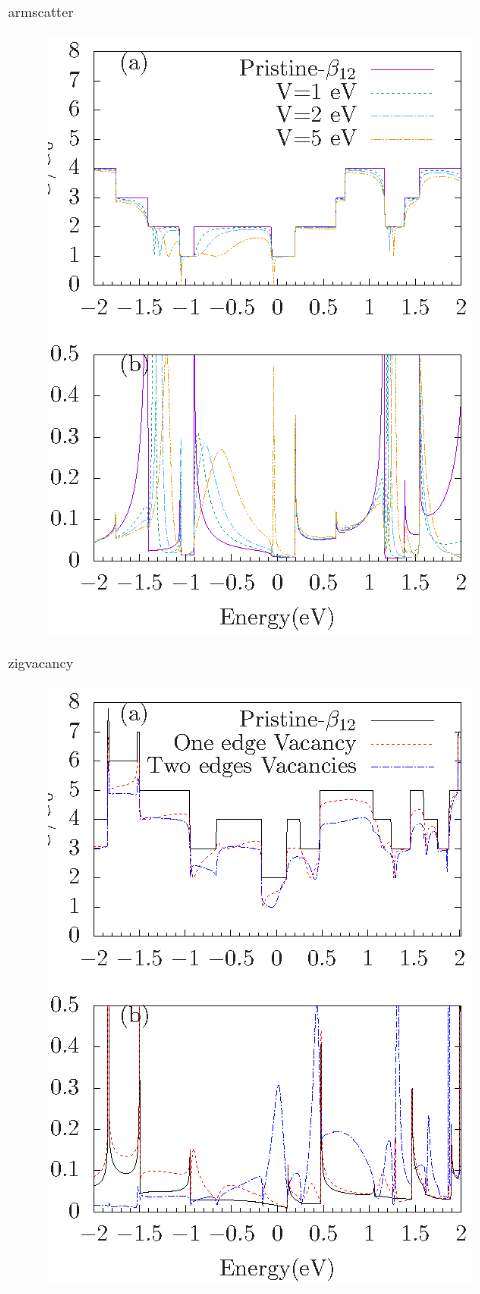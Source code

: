\documentclass[handout,t]{beamer}
\begin{document}
\begin{frame}{armscatter}
	\begin{figure}[ht]
		\centering
		\includegraphics[width=.5\linewidth]{../figures/armscatter-thesis.eps}
		\label{armscatter}
	  \end{figure}
\end{frame}
\begin{frame}{zigvacancy}
	\begin{figure}[ht]
		\centering
		\includegraphics[width=.5\linewidth]{../figures/zigvacancy-thesis.eps}
		\label{zigvacancy}
	  \end{figure}
\end{frame}
\end{document}
